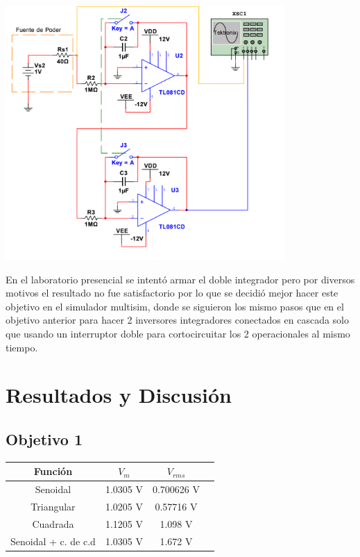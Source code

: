 \documentclass[DIV=calc, paper=a4, fontsize=11pt]{scrartcl}
\newenvironment{Figura}
  {\par\medskip\noindent\minipage{\linewidth}}
  {\endminipage\par\medskip}
\begin{document}
\begin{multicols}{2}
\begin{Figura}
    \centering
    \includegraphics[width=0.8\textwidth]{diagramas/diagrama objetivo 5.PNG}
    \label{fig}
\end{Figura}

En el laboratorio presencial se intentó armar el doble integrador pero por diversos motivos el resultado no fue satisfactorio por lo que se decidió mejor hacer este objetivo en el simulador multisim, donde se siguieron los mismo pasos que en el objetivo anterior para hacer 2 inversores integradores conectados en cascada solo que usando un interruptor doble para cortocircuitar los 2 operacionales al mismo tiempo.



\section*{Resultados y Discusión}

\subsection*{Objetivo 1}

\begin{tabular}{|c|c|c|c|} 
 \hline
 Función  & $V_{m}$ & $V_{rms}$ \\ 
 \hline
 Senoidal  & 1.0305 V & 0.700626 V  \\  \hline
 Triangular  & 1.0205 V & 0.57716 V \\ \hline
 Cuadrada  & 1.1205 V & 1.098 V  \\ \hline
 Senoidal + c. de c.d & 1.0305 V & 1.672 V  \\ \hline


\end{tabular}
\end{multicols}
\end{document}
